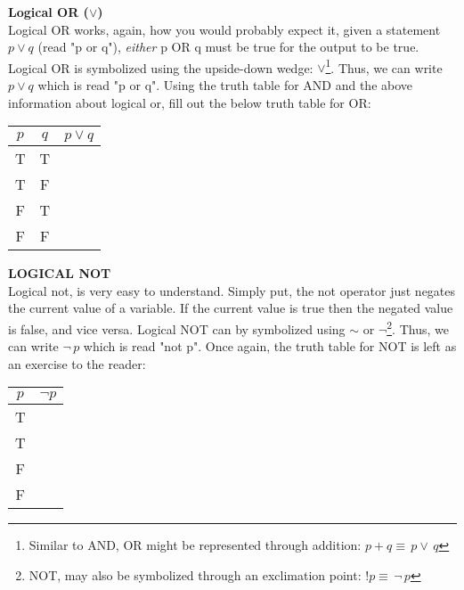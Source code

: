 \documentclass[addpoints]{exam}
\begin{document}
\begin{tcolorbox}[title= LOGICAL OR,colframe=black,sharp corners,colback=white,colbacktitle=white,coltitle=black]
  \large\textbf{Logical OR ($\lor$)} \\
  \normalsize Logical OR works, again, how you would probably expect it, given a statement $p \lor q$ (read "p or q"), \textit{either} p OR q must be true for the output to be true. Logical OR is symbolized using the upside-down wedge: $\lor$\footnote{Similar to AND, OR might be represented through addition: $p+q\equiv\,p\lor\,q$}. Thus, we can write $p \lor q$ which is read "p or q". Using the truth table for AND and the above information about logical or, fill out the below truth table for OR:
  \vspace{0.01in}
  \begin{center}
    \begin{tabular}{ |c|c|c| } 
      \hline
      $p$ & $q$ & $p \lor q$ \\ 
      \hline
      T & T &   \\ 
      T & F &   \\ 
      F & T &   \\ 
      F & F &   \\ 
      \hline
    \end{tabular}
  \end{center}
  \vspace{0.01in}
\end{tcolorbox}

\newpage 


\begin{tcolorbox}[title= LOGICAL NOT,colframe=black,sharp corners,colback=white,colbacktitle=white,coltitle=black]
\large \textbf{LOGICAL NOT} \\ 
  \normalsize Logical not, is very easy to understand. Simply put, the not operator just negates the current value of a variable. If the current value is true then the negated value is false, and vice versa. Logical NOT can by symbolized using $\sim$ or $\lnot$\footnote{NOT, may also be symbolized through an exclimation point: $!p\equiv\,\lnot\,p$}. Thus, we can write $\lnot\,p$ which is read "not p". Once again, the truth table for NOT is left as an exercise to the reader:
  \vspace{0.01in}
  \begin{center}
    \begin{tabular}{ |c|c| } 
      \hline
      $p$ & $\lnot p$ \\ 
      \hline
      T &  \\ 
      T &  \\ 
      F &  \\ 
      F &  \\ 
      \hline
    \end{tabular}
  \end{center}
  \vspace{0.01in}
\end{tcolorbox}
\end{document}
